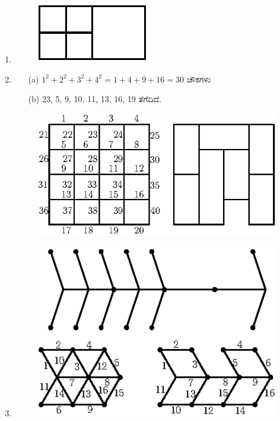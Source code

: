 \begin{enumerate}
\item 
\begin{figure}[H]
\centering
\includegraphics{images/chap4/ans16.eps}
 \end{figure}

\item 
\begin{itemize}
\item[(a)] $1^{2} + 2^{2} + 3^{2} + 4^{2} = 1 + 4 + 9 + 16 = 30$ ಚೌಕಗಳು 
\item[(b)] 23, 5, 9, 10, 11, 13, 16, 19 ತೆಗೆದಿದೆ.
\end{itemize}

\begin{figure}[H]
\centering
\includegraphics{images/chap4/ans17.eps}
\end{figure}

\item 
\begin{figure}[H]
\centering
\includegraphics{images/chap4/ans18.eps}
\end{figure}


\end{enumerate}

